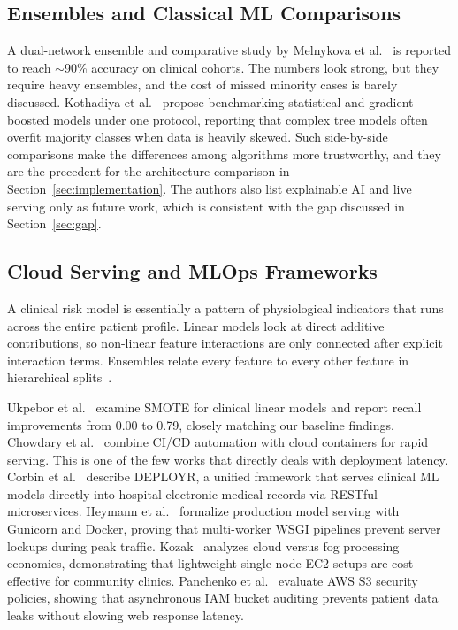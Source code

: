 \documentclass[10pt,twocolumn,a4paper]{article}
\begin{document}
\subsection{Ensembles and Classical ML Comparisons}
A dual-network ensemble and comparative study by Melnykova et al.~\cite{melnykova2025} is reported to reach $\sim$90\% accuracy on clinical cohorts. The numbers look strong, but they require heavy ensembles, and the cost of missed minority cases is barely discussed. Kothadiya et al.~\cite{kothadiya2023} propose benchmarking statistical and gradient-boosted models under one protocol, reporting that complex tree models often overfit majority classes when data is heavily skewed. Such side-by-side comparisons make the differences among algorithms more trustworthy, and they are the precedent for the architecture comparison in Section~\ref{sec:implementation}. The authors also list explainable AI and live serving only as future work, which is consistent with the gap discussed in Section~\ref{sec:gap}.

\subsection{Cloud Serving and MLOps Frameworks}
A clinical risk model is essentially a pattern of physiological indicators that runs across the entire patient profile. Linear models look at direct additive contributions, so non-linear feature interactions are only connected after explicit interaction terms. Ensembles relate every feature to every other feature in hierarchical splits~\cite{laurikkala2001}.

Ukpebor et al.~\cite{ukpebor2025} examine SMOTE for clinical linear models and report recall improvements from 0.00 to 0.79, closely matching our baseline findings. Chowdary et al.~\cite{chowdary2022} combine CI/CD automation with cloud containers for rapid serving. This is one of the few works that directly deals with deployment latency. Corbin et al.~\cite{corbin2023} describe DEPLOYR, a unified framework that serves clinical ML models directly into hospital electronic medical records via RESTful microservices. Heymann et al.~\cite{heymann2022} formalize production model serving with Gunicorn and Docker, proving that multi-worker WSGI pipelines prevent server lockups during peak traffic. Kozak~\cite{kozak2021} analyzes cloud versus fog processing economics, demonstrating that lightweight single-node EC2 setups are cost-effective for community clinics. Panchenko et al.~\cite{panchenko2024} evaluate AWS S3 security policies, showing that asynchronous IAM bucket auditing prevents patient data leaks without slowing web response latency.
\end{document}
